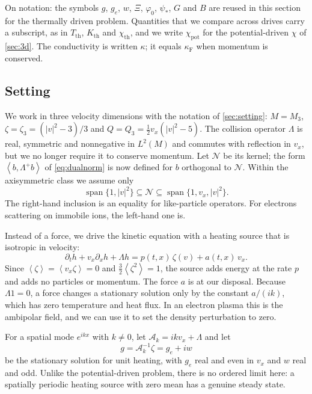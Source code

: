 \documentclass[11pt]{article}
\newcommand{\av}[1]{\left\langle #1\right\rangle}
\newcommand{\A}{\mathcal A}
\newcommand{\F}{\kappa_{\mathrm F}}
\newcommand{\N}{\mathcal N}
\newcommand{\kap}{\kappa}
\newcommand{\thr}{\mathrm{th}}
\newcommand{\pot}{\mathrm{pot}}
\newcommand{\dual}[1]{\left\langle #1,\Lambda^+ #1\right\rangle}
\theoremstyle{definition}
\theoremstyle{remark}
\numberwithin{equation}{section}
\begin{document}
On notation: the symbols $g$, $g_e$, $w$, $\Xi$, $\varphi_0$, $\psi_*$,
$G$ and $B$ are reused in this section for the thermally driven problem.
Quantities that we compare across drives carry a subscript, as in
$T_\thr$, $K_\thr$ and $\chi_\thr$, and we write $\chi_\pot$ for the
potential-driven $\chi$ of \cref{sec:3d}. The conductivity is written
$\kap$; it equals $\F$ when momentum is conserved.

\subsection{Setting}

We work in three velocity dimensions with the notation of
\cref{sec:setting}: $M=M_3$, $\zeta=\zeta_3=(|v|^2-3)/3$ and
$Q=Q_3=\tfrac12v_x(|v|^2-5)$. The collision operator $\Lambda$ is real,
symmetric and nonnegative in $L^2(M)$ and commutes with reflection in
$v_x$, but we no longer require it to conserve momentum. Let $\N$ be its
kernel; the form $\dual b$ of \eqref{eq:dualnorm} is now defined for $b$
orthogonal to $\N$. Within the axisymmetric class we assume only
\begin{equation}
 \operatorname{span}\{1,|v|^2\}\subseteq\N\subseteq
 \operatorname{span}\{1,v_x,|v|^2\}.
 \label{eq:th-kernel}
\end{equation}
The right-hand inclusion is an equality for like-particle operators. For
electrons scattering on immobile ions, the left-hand one is.

Instead of a force, we drive the kinetic equation with a heating source
that is isotropic in velocity:
\begin{equation}
 \partial_th+v_x\partial_xh+\Lambda h=p(t,x)\,\zeta(v)+a(t,x)\,v_x .
 \label{eq:th-kinetic}
\end{equation}
Since $\av\zeta=\av{v_x\zeta}=0$ and $\tfrac32\av{\zeta^2}=1$, the source
adds energy at the rate $p$ and adds no particles or momentum. The force
$a$ is at our disposal. Because $\Lambda1=0$, a force changes a stationary
solution only by the constant $a/(ik)$, which has zero temperature and
heat flux. In an electron plasma this is the ambipolar field, and we can
use it to set the density perturbation to zero.

For a spatial mode $e^{ikx}$ with $k\ne0$, let $\A_k=ikv_x+\Lambda$ and let
\begin{equation}
 g=\A_k^{-1}\zeta=g_e+iw
 \label{eq:th-g}
\end{equation}
be the stationary solution for unit heating, with $g_e$ real and even in
$v_x$ and $w$ real and odd. Unlike the potential-driven problem, there is
no ordered limit here: a spatially periodic heating source with zero mean
has a genuine steady state.
\end{document}
